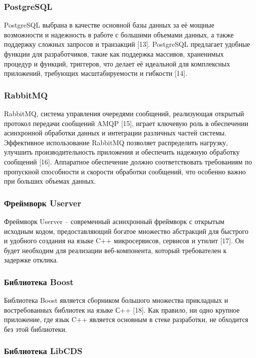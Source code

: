 \subsubsection{PostgreSQL}

PostgreSQL выбрана в качестве основной базы данных за её мощные возможности и надежность в работе с большими объемами данных, а также поддержку сложных запросов и транзакций [13]. PostgreSQL предлагает удобные функции для разработчиков, такие как поддержка массивов, храненимых процедур и функций, триггеров, что делает её идеальной для комплексных приложений, требующих масштабируемости и гибкости [14].

\subsubsection{RabbitMQ} 
RabbitMQ, система управления очередями сообщений, реализующая открытый протокол передачи сообщений AMQP [15], играет ключевую роль в обеспечении асинхронной обработки данных и интеграции различных частей системы. Эффективное использование RabbitMQ позволяет распределить нагрузку, улучшить производительность приложения и обеспечить надежную обработку сообщений [16]. Аппаратное обеспечение должно соответствовать требованиям по пропускной способности и скорости обработки сообщений, что особенно важно при больших объемах данных.

\subsubsection{Фреймворк Userver}
Фреймворк Userver -- современный асинхронный фреймворк с открытым исходным кодом, предоставляющий богатое множество абстракций для быстрого и удобного создания на языке C++ микросервисов, сервисов и утилит [17]. Он будет необходим для реализации веб-компонента, который требователен к задержке отклика.

\subsubsection{Библиотека Boost}

Библиотека Boost является сборником большого множества прикладных и востребованных библиотек на языке С++ [18]. Как правило, ни одно крупное приложение, где язык C++ является основным в стеке разработки, не обходится без этой библиотеки.
 
\subsubsection{Библиотека LibCDS}

